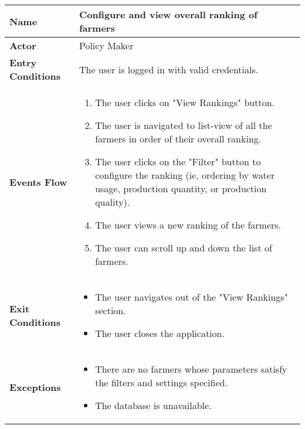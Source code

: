 
\begin{center}
\renewcommand{\arraystretch}{1.25}
\begin{tabular}{|l|>{\raggedright\arraybackslash}m{12cm}|}

    \hline
    \textbf{Name} & Configure and view overall ranking of farmers\\
    \hline
   	\textbf{Actor} & Policy Maker\\
    \hline
    \textbf{Entry Conditions} & The user is logged in with valid credentials.\\
    \hline
    \textbf{Events Flow} & 
    \begin{enumerate}
   	\item The user clicks on "View Rankings" button.
   	\item The user is navigated to list-view of all the farmers in order of their overall ranking. 
    \item The user clicks on the "Filter" button to configure the ranking (ie, ordering by water usage, production quantity, or production quality). 
    	\item The user views a new ranking of the farmers. 
    	\item The user can scroll up and down the list of farmers.
    \end{enumerate} \\ \hline
    \textbf{Exit Conditions} & 
    \begin{itemize}
    	\item The user navigates out of the "View Rankings" section. 
    	\item The user closes the application.
    \end{itemize}\\
    \hline
    \textbf{Exceptions} & 
    \begin{itemize}
    	\item There are no farmers whose parameters satisfy the filters and settings specified.
    	\item The database is unavailable.
    \end{itemize}\\
    \hline
\end{tabular}
\end{center}